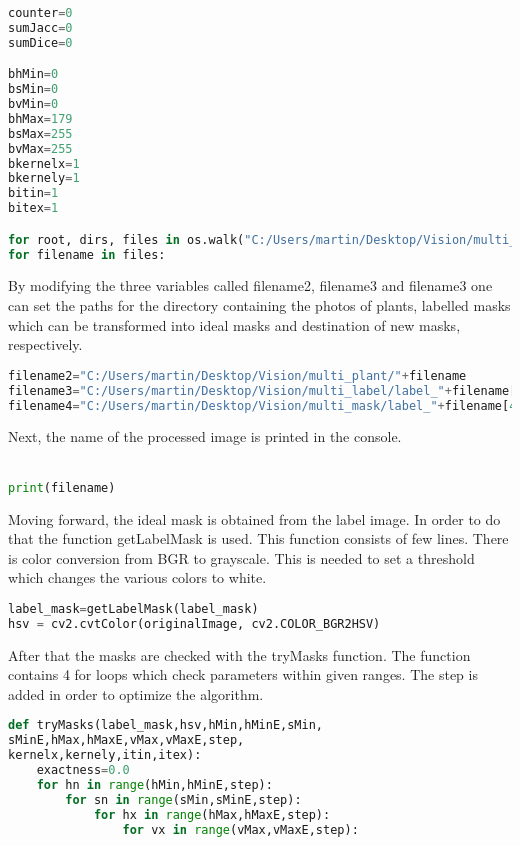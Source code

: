 \documentclass[12pt]{article}
\begin{document}
\begin{lstlisting}[language=Python]
counter=0
sumJacc=0
sumDice=0

bhMin=0
bsMin=0
bvMin=0
bhMax=179
bsMax=255
bvMax=255
bkernelx=1
bkernely=1
bitin=1
bitex=1

for root, dirs, files in os.walk("C:/Users/martin/Desktop/Vision/multi_plant"):
for filename in files:
\end{lstlisting}
\vspace{5mm}
 By modifying the three variables called filename2, filename3 and filename3 one can set the paths for the directory containing the photos of plants, labelled masks which can be transformed into ideal masks and destination of new masks, respectively. 
\vspace{5mm}
\begin{lstlisting}[language=Python]
filename2="C:/Users/martin/Desktop/Vision/multi_plant/"+filename
filename3="C:/Users/martin/Desktop/Vision/multi_label/label_"+filename[4:]
filename4="C:/Users/martin/Desktop/Vision/multi_mask/label_"+filename[4:]
\end{lstlisting}
\vspace{5mm}
\newpage
Next, the name of the processed image is printed in the console.\\\\
\begin{lstlisting}[language=Python]
print(filename)
\end{lstlisting}
\vspace{5mm}
Moving forward, the ideal mask is obtained from the label image. In order to do that the function getLabelMask is used. This function consists of few lines. There is color conversion from BGR to grayscale. This is needed to set a threshold which changes the various colors to white. 
\vspace{5mm}
\begin{lstlisting}[language=Python]
label_mask=getLabelMask(label_mask)
hsv = cv2.cvtColor(originalImage, cv2.COLOR_BGR2HSV)
\end{lstlisting}
\vspace{5mm}
After that the masks are checked with the tryMasks function. The function contains 4 for loops which check parameters within given ranges. The step is added in order to optimize the algorithm. 
\vspace{5mm}
\begin{lstlisting}[language=Python]
def tryMasks(label_mask,hsv,hMin,hMinE,sMin,
sMinE,hMax,hMaxE,vMax,vMaxE,step,
kernelx,kernely,itin,itex):
	exactness=0.0
	for hn in range(hMin,hMinE,step):
		for sn in range(sMin,sMinE,step):
			for hx in range(hMax,hMaxE,step):
				for vx in range(vMax,vMaxE,step):
\end{lstlisting}
\end{document}
